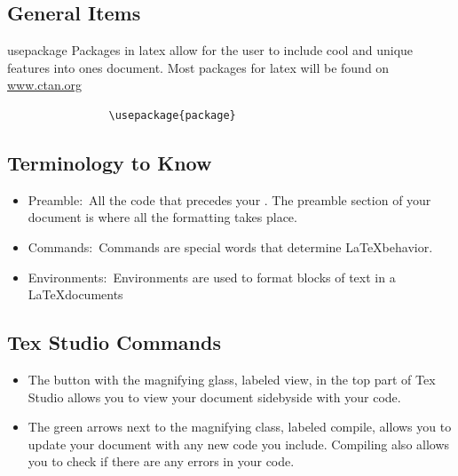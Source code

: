 	\subsection{General Items}
		\begin{docCommand}{usepackage}{}
			Packages in latex allow for the user to include cool and unique features into ones document. Most packages for latex will be found on \url{www.ctan.org}
			\begin{verbatim}
				\usepackage{package}
			\end{verbatim}
		\end{docCommand}
	\subsection{Terminology to Know}
			\begin{itemize}
				\item Preamble:\, All the code that precedes your . The preamble section of your document is where all the formatting takes place. 
				\item Commands:\, Commands are special words that determine \LaTeX behavior.
				\item Environments:\, Environments are used to format blocks of text in a \LaTeX documents
			\end{itemize}
	\subsection{Tex Studio Commands}
		\begin{itemize}
			\item The button with the magnifying glass, labeled view, in the top part of Tex Studio allows you to view your document sidebyside with your code.
			\item The green arrows next to the magnifying class, labeled compile, allows you to update your document with any new code you include. Compiling also allows you to check if there are any errors in your code.  
		\end{itemize}
